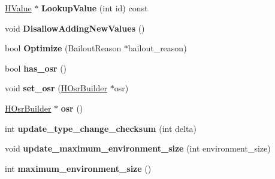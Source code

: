 \begin{DoxyCompactItemize}
\item 
\hyperlink{classv8_1_1internal_1_1_h_value}{H\+Value} $\ast$ {\bfseries Lookup\+Value} (int id) const \hypertarget{classv8_1_1internal_1_1_h_graph_af57b73539c7535e0096de1fd7b65da74}{}\label{classv8_1_1internal_1_1_h_graph_af57b73539c7535e0096de1fd7b65da74}

\item 
void {\bfseries Disallow\+Adding\+New\+Values} ()\hypertarget{classv8_1_1internal_1_1_h_graph_a4536e5ac44475cb9366e79c658195db4}{}\label{classv8_1_1internal_1_1_h_graph_a4536e5ac44475cb9366e79c658195db4}

\item 
bool {\bfseries Optimize} (Bailout\+Reason $\ast$bailout\+\_\+reason)\hypertarget{classv8_1_1internal_1_1_h_graph_a9299a25db0f64d51c6357b9af56a3964}{}\label{classv8_1_1internal_1_1_h_graph_a9299a25db0f64d51c6357b9af56a3964}

\item 
bool {\bfseries has\+\_\+osr} ()\hypertarget{classv8_1_1internal_1_1_h_graph_af49a3668eb4c213a49e436dea0de8abe}{}\label{classv8_1_1internal_1_1_h_graph_af49a3668eb4c213a49e436dea0de8abe}

\item 
void {\bfseries set\+\_\+osr} (\hyperlink{classv8_1_1internal_1_1_h_osr_builder}{H\+Osr\+Builder} $\ast$osr)\hypertarget{classv8_1_1internal_1_1_h_graph_a338bda42cbffb9a3612bc4f1cfe7d711}{}\label{classv8_1_1internal_1_1_h_graph_a338bda42cbffb9a3612bc4f1cfe7d711}

\item 
\hyperlink{classv8_1_1internal_1_1_h_osr_builder}{H\+Osr\+Builder} $\ast$ {\bfseries osr} ()\hypertarget{classv8_1_1internal_1_1_h_graph_ab28d9a0e864b62dfbc281dc501bdb9cb}{}\label{classv8_1_1internal_1_1_h_graph_ab28d9a0e864b62dfbc281dc501bdb9cb}

\item 
int {\bfseries update\+\_\+type\+\_\+change\+\_\+checksum} (int delta)\hypertarget{classv8_1_1internal_1_1_h_graph_aeecb7d9dd0938abdf7ba1876403711d0}{}\label{classv8_1_1internal_1_1_h_graph_aeecb7d9dd0938abdf7ba1876403711d0}

\item 
void {\bfseries update\+\_\+maximum\+\_\+environment\+\_\+size} (int environment\+\_\+size)\hypertarget{classv8_1_1internal_1_1_h_graph_a202acbd24a60215e5b15cb94c92b0579}{}\label{classv8_1_1internal_1_1_h_graph_a202acbd24a60215e5b15cb94c92b0579}

\item 
int {\bfseries maximum\+\_\+environment\+\_\+size} ()\hypertarget{classv8_1_1internal_1_1_h_graph_a3371d77565e8b672f1b90819ecb1973d}{}\label{classv8_1_1internal_1_1_h_graph_a3371d77565e8b672f1b90819ecb1973d}


\end{DoxyCompactItemize}
